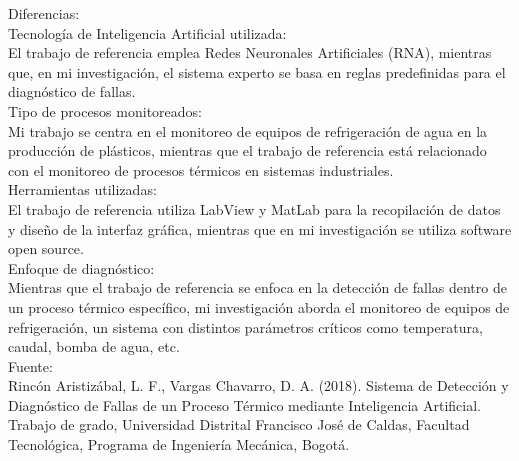 Diferencias: \\
Tecnología de Inteligencia Artificial utilizada: \\
El trabajo de referencia emplea Redes Neuronales Artificiales (RNA), mientras que, en mi investigación, el sistema experto se basa en reglas predefinidas para el diagnóstico de fallas.\\
Tipo de procesos monitoreados: \\
Mi trabajo se centra en el monitoreo de equipos de refrigeración de agua en la producción de plásticos, mientras que el trabajo de referencia está relacionado con el monitoreo de procesos térmicos en sistemas industriales.\\
Herramientas utilizadas: \\
El trabajo de referencia utiliza LabView y MatLab para la recopilación de datos y diseño de la interfaz gráfica, mientras que en mi investigación se utiliza software open source. \\
Enfoque de diagnóstico: \\
Mientras que el trabajo de referencia se enfoca en la detección de fallas dentro de un proceso térmico específico, mi investigación aborda el monitoreo de equipos de refrigeración, un sistema con distintos parámetros críticos como temperatura, caudal, bomba de agua, etc. \\
Fuente: \\
Rincón Aristizábal, L. F., Vargas Chavarro, D. A. (2018). Sistema de Detección y Diagnóstico de Fallas de un Proceso Térmico mediante Inteligencia Artificial. Trabajo de grado, Universidad Distrital Francisco José de Caldas, Facultad Tecnológica, Programa de Ingeniería Mecánica, Bogotá. \\


